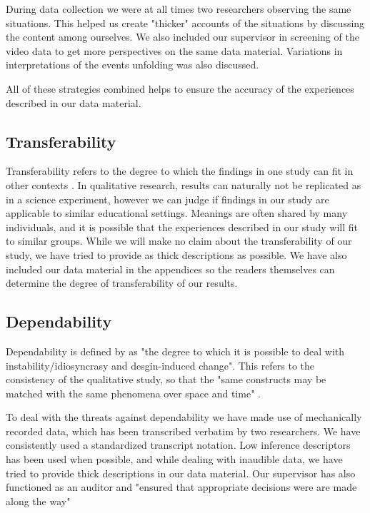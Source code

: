 During data collection we were at all times two researchers observing the same situations. This helped us create "thicker" \citep{geertz1973interpretation} accounts of the situations by discussing the content among ourselves. We also included our supervisor in screening of the video data to get more perspectives on the same data material. Variations in interpretations of the events unfolding was also discussed.

All of these strategies combined helps to ensure the accuracy of the experiences described in our data material. 

\subsection{Transferability}
Transferability refers to the degree to which the findings in one study can fit in other contexts \citep{baxter1997evaluating}. In qualitative research, results can naturally not be replicated as in a science experiment, however we can judge if findings in our study are applicable to similar educational settings. Meanings are often shared by many individuals, and it is possible that the experiences described in our study will fit to similar groups. 
While we will make no claim about the transferability of our study, we have tried to provide as thick descriptions as possible. We have also included our data material in the appendices so the readers themselves can determine the degree of transferability of our results. 

\subsection{Dependability}
Dependability is defined by \citet{baxter1997evaluating} as "the degree to which it is possible to deal with instability/idiosyncrasy and desgin-induced change". This refers to the consistency of the qualitative study, so that the "same constructs may be matched with the same phenomena over space and time" \citep{baxter1997evaluating}. 

To deal with the threats against dependability we have made use of mechanically recorded data, which has been transcribed verbatim by two researchers. We have consistently used a standardized transcript notation. Low inference descriptors has been used when possible, and while dealing with inaudible data, we have tried to provide thick descriptions in our data material. Our supervisor has also functioned as an auditor and "ensured that appropriate decisions were are made along the way" \citep{baxter1997evaluating}

